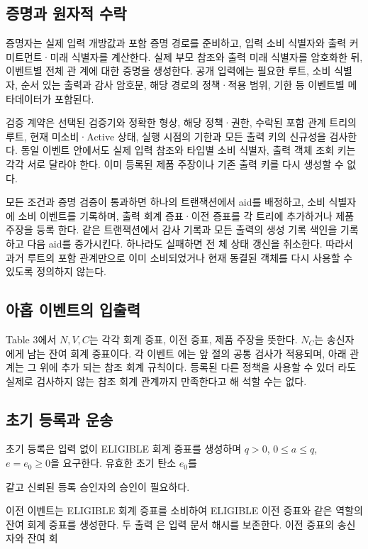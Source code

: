 \subsection{증명과 원자적 수락}
증명자는 실제 입력 개방값과 포함 증명 경로를 준비하고, 입력
소비 식별자와 출력 커미트먼트·미래 식별자를 계산한다. 실제
부모 참조와 출력 미래 식별자를 암호화한 뒤, 이벤트별 전체 관
계에 대한 증명을 생성한다. 공개 입력에는 필요한 루트, 소비
식별자, 순서 있는 출력과 감사 암호문, 해당 경로의 정책·적용
범위, 기한 등 이벤트별 메타데이터가 포함된다.

검증 계약은 선택된 검증기와 정확한 형상, 해당 정책·권한,
수락된 포함 관계 트리의 루트, 현재 미소비·Active 상태, 실행
시점의 기한과 모든 출력 키의 신규성을 검사한다. 동일 이벤트
안에서도 실제 입력 참조와 타입별 소비 식별자, 출력 객체 조회
키는 각각 서로 달라야 한다. 이미 등록된 제품 주장이나 기존
출력 키를 다시 생성할 수 없다.

모든 조건과 증명 검증이 통과하면 하나의 트랜잭션에서
aid를 배정하고, 소비 식별자에 소비 이벤트를 기록하며, 출력
회계 증표·이전 증표를 각 트리에 추가하거나 제품 주장을 등록
한다. 같은 트랜잭션에서 감사 기록과 모든 출력의 생성 기록
색인을 기록하고 다음 aid를 증가시킨다. 하나라도 실패하면 전
체 상태 갱신을 취소한다. 따라서 과거 루트의 포함 관계만으로
이미 소비되었거나 현재 동결된 객체를 다시 사용할 수 있도록
정의하지 않는다.

\subsection{아홉 이벤트의 입출력}
Table 3에서 \(N,V,C\)는 각각 회계 증표, 이전 증표, 제품 주장을
뜻한다. \(N_{C}\)는 송신자에게 남는 잔여 회계 증표이다. 각 이벤트
에는 앞 절의 공통 검사가 적용되며, 아래 관계는 그 위에 추가
되는 참조 회계 규칙이다. 등록된 다른 정책을 사용할 수 있더
라도 실제로 검사하지 않는 참조 회계 관계까지 만족한다고 해
석할 수는 없다.

\subsection{초기 등록과 운송}
초기 등록은 입력 없이 ELIGIBLE 회계 증표를 생성하며 \(q>0\),
\(0≤a≤q\), \(e=e_{0}≥0\)을 요구한다. 유효한 초기 탄소 \(e_{0}\)를

같고 신뢰된 등록 승인자의 승인이 필요하다.

이전 이벤트는 ELIGIBLE 회계 증표를 소비하여 ELIGIBLE
이전 증표와 같은 역할의 잔여 회계 증표를 생성한다. 두 출력
은 입력 문서 해시를 보존한다. 이전 증표의 송신자와 잔여 회

